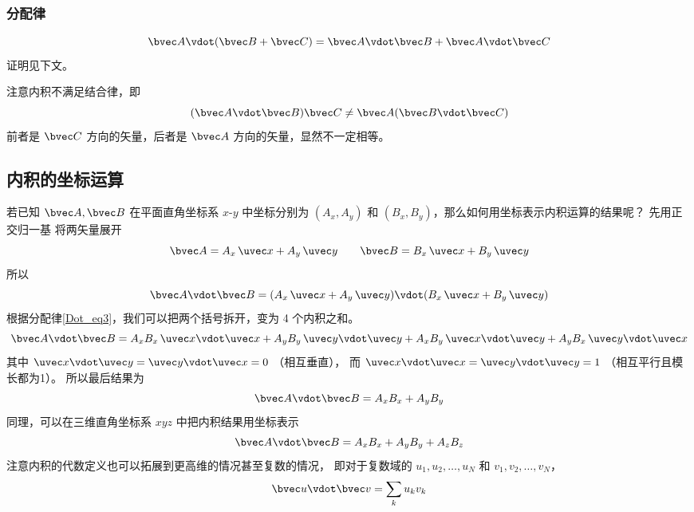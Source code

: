 \subsubsection{分配律}
\begin{equation}\label{Dot_eq3}
\bvec A \vdot (\bvec B + \bvec C) = \bvec A \vdot \bvec B + \bvec A \vdot \bvec C
\end{equation}
证明见下文。

注意内积不满足结合律，即
\begin{equation}
(\bvec A \vdot \bvec B) \bvec C \ne  \bvec A (\bvec B \vdot \bvec C)
\end{equation}
前者是 $\bvec C$ 方向的矢量，后者是 $\bvec A$ 方向的矢量，显然不一定相等。

\subsection{内积的坐标运算}
若已知 $\bvec A, \bvec B$ 在平面直角坐标系 $x$-$y$ 中坐标分别为 $(A_x, A_y)$ 和  $(B_x, B_y)$，那么如何用坐标表示内积运算的结果呢？ 先用正交归一基 将两矢量展开 %
\begin{equation}
\bvec A = A_x \,\uvec x + A_y \,\uvec y \qquad \bvec B = B_x \,\uvec x + B_y \,\uvec y
\end{equation}
所以
\begin{equation}
\bvec A \vdot \bvec B = (A_x \,\uvec x + A_y \,\uvec y) \vdot (B_x \,\uvec x + B_y \,\uvec y)
\end{equation}
根据分配律\autoref{Dot_eq3}，我们可以把两个括号拆开，变为 4 个内积之和。 
\begin{equation}
\bvec A \vdot \bvec B = A_x B_x \,\uvec x \vdot \uvec x + A_y B_y \,\uvec y \vdot \uvec y + A_x B_y \,\uvec x \vdot \uvec y + A_y B_x \,\uvec y \vdot \uvec x
\end{equation}
其中 $\uvec x \vdot \uvec y = \uvec y \vdot \uvec x = 0$ （相互垂直）， 而 $\uvec x \vdot \uvec x = \uvec y \vdot \uvec y = 1$ （相互平行且模长都为1）。 所以最后结果为
\begin{equation}\label{Dot_eq5}
\bvec A \vdot \bvec B = A_x B_x + A_y B_y
\end{equation}
同理，可以在三维直角坐标系 $xyz$ 中把内积结果用坐标表示
\begin{equation}\label{Dot_eq4}
\bvec A \vdot \bvec B = A_x B_x + A_y B_y + A_z B_z	
\end{equation}
注意内积的代数定义也可以拓展到更高维的情况甚至复数的情况， 即对于复数域的 $u_1, u_2, \dots, u_N$ 和 $v_1, v_2, \dots, v_N$，
\begin{equation}
\bvec u \vdot \bvec v = \sum_k u_k v_k
\end{equation}

